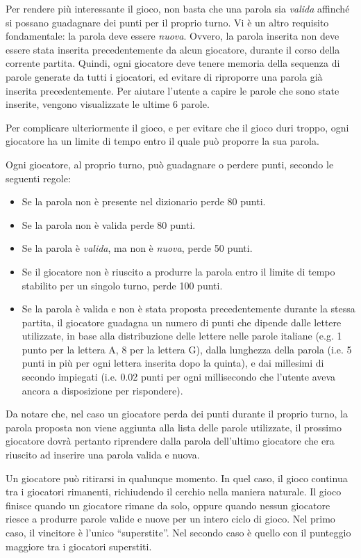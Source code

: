 \documentclass[9pt]{article}
\begin{document}
Per rendere più interessante il gioco, non basta che una parola sia \emph{valida} affinché si possano guadagnare dei punti per il proprio turno. Vi è un altro requisito fondamentale: la parola deve essere \emph{nuova}. Ovvero, la parola inserita non deve essere stata inserita precedentemente da alcun giocatore, durante il corso della corrente partita. Quindi, ogni giocatore deve tenere memoria della sequenza di parole generate da tutti i giocatori, ed evitare di riproporre una parola già inserita precedentemente. Per aiutare l'utente a capire le parole che sono state inserite, vengono visualizzate le ultime 6 parole.

Per complicare ulteriormente il gioco, e per evitare che il gioco duri troppo, ogni giocatore ha un limite di tempo entro il quale può proporre la sua parola.

Ogni giocatore, al proprio turno, può guadagnare o perdere punti, secondo le seguenti regole:
\begin{itemize}
\item Se la parola non è presente nel dizionario perde 80 punti.
\item Se la parola non è valida perde 80 punti.
\item Se la parola è \emph{valida}, ma non è \emph{nuova}, perde 50 punti.
\item Se il giocatore non è riuscito a produrre la parola entro il limite di tempo stabilito per un singolo turno, perde 100 punti.
\item Se la parola è valida e non è stata proposta precedentemente durante la stessa partita, il giocatore guadagna un numero di punti che dipende dalle lettere utilizzate, in base alla distribuzione delle lettere nelle parole italiane (e.g. 1 punto per la lettera A, 8 per la lettera G), dalla lunghezza della parola (i.e. 5 punti in più per ogni lettera inserita dopo la quinta), e dai millesimi di secondo impiegati (i.e. 0.02 punti per ogni millisecondo che l'utente aveva ancora a disposizione per rispondere).
\end{itemize}

Da notare che, nel caso un giocatore perda dei punti durante il proprio turno, la parola proposta non viene aggiunta alla lista delle parole utilizzate, il prossimo giocatore dovrà pertanto riprendere dalla parola dell'ultimo giocatore che era riuscito ad inserire una parola valida e nuova.

Un giocatore può ritirarsi in qualunque momento. In quel caso, il gioco continua tra i giocatori rimanenti, richiudendo il cerchio nella maniera naturale. Il gioco finisce quando un giocatore rimane da solo, oppure quando nessun giocatore riesce a produrre parole valide e nuove per un intero ciclo di gioco. Nel primo caso, il vincitore è l'unico ``superstite''. Nel secondo caso è quello con il punteggio maggiore tra i giocatori superstiti.
\end{document}
